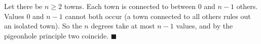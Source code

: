Let there be $n\ge2$ towns. Each town is connected to between $0$ and $n-1$ others. Values $0$ and $n-1$ cannot both occur (a town connected to all others rules out an isolated town). So the $n$ degrees take at most $n-1$ values, and by the pigeonhole principle two coincide. $\blacksquare$
